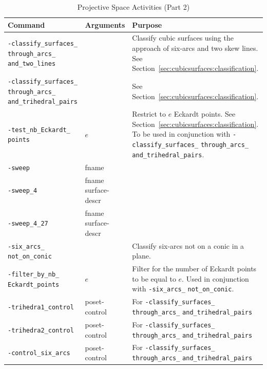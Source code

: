 \begin{table}
	\begin{center}
	\begin{tabular}{|p{4cm}|p{3cm}|p{7cm}|}
		\hline
		Command & Arguments & Purpose \\
		\hline
		\hline
		\verb'-classify_surfaces_' \verb'through_arcs_' \verb'and_two_lines' &    &  
		Classify cubic surfaces using the approach of six-arcs and two skew lines. 
		See Section~\ref{sec:cubicsurfaces:classification}.  \\
		\hline
		\verb'-classify_surfaces_' \verb'through_arcs_' \verb'and_trihedral_pairs' &    & See Section~\ref{sec:cubicsurfaces:classification}.  \\
		\hline
		\verb'-test_nb_Eckardt_' \verb'points' &  $e$  & Restrict to $e$ Eckardt points. See Section~\ref{sec:cubicsurfaces:classification}. To be used in conjunction with \verb'-classify_surfaces_' \verb'through_arcs_' \verb'and_trihedral_pairs'.  \\
		\hline
		\verb'-sweep' & fname   &   \\
		\hline
		\verb'-sweep_4' &  fname surface-descr &   \\
		\hline
		\verb'-sweep_4_27' &  fname surface-descr  &   \\
		\hline
		\verb'-six_arcs_' \verb'not_on_conic' &    & Classify six-arcs not on a conic in a plane.   \\
		\hline
		\verb'-filter_by_nb_' \verb'Eckardt_points' & $e$   &  Filter for the number of Eckardt points to be equal to $e$. Used in conjunction with \verb'-six_arcs_' \verb'not_on_conic'. \\
		\hline
		\verb'-trihedra1_control' &   poset-control &  For \verb'-classify_surfaces_' \verb'through_arcs_' \verb'and_trihedral_pairs' \\
		\hline
		\verb'-trihedra2_control' & poset-control   &  For \verb'-classify_surfaces_' \verb'through_arcs_' \verb'and_trihedral_pairs' \\
		\hline
		\verb'-control_six_arcs' &  poset-control  &  For \verb'-classify_surfaces_' \verb'through_arcs_' \verb'and_trihedral_pairs' \\
		\hline
		\end{tabular}
	\end{center}
	\caption{\label{tab:projective:space:activities:2}Projective Space Activities (Part 2)}
\end{table}
